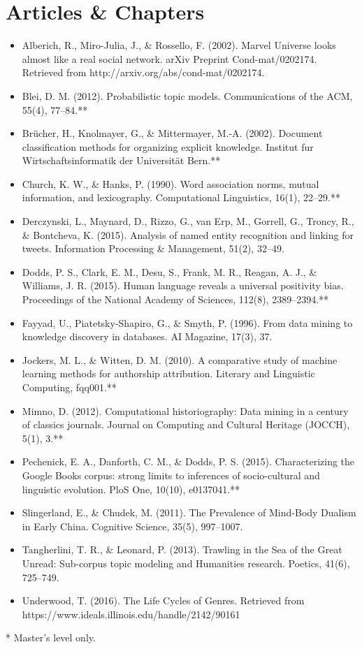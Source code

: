 \documentclass[12pt,a4paper]{article}
\begin{document}
\section*{Articles \& Chapters}	
\begin{itemize}
\item Alberich, R., Miro-Julia, J., \& Rossello, F. (2002). Marvel Universe looks almost like a real social network. arXiv Preprint Cond-mat/0202174. Retrieved from http://arxiv.org/abs/cond-mat/0202174.

\item Blei, D. M. (2012). Probabilistic topic models. Communications of the ACM, 55(4), 77–84.**
\item Brücher, H., Knolmayer, G., \& Mittermayer, M.-A. (2002). Document classification methods for organizing explicit knowledge. Institut fur Wirtschaftsinformatik der Universität Bern.**
\item Church, K. W., \& Hanks, P. (1990). Word association norms, mutual information, and lexicography. Computational Linguistics, 16(1), 22–29.**
\item Derczynski, L., Maynard, D., Rizzo, G., van Erp, M., Gorrell, G., Troncy, R., \& Bontcheva, K. (2015). Analysis of named entity recognition and linking for tweets. Information Processing \& Management, 51(2), 32–49.
\item Dodds, P. S., Clark, E. M., Desu, S., Frank, M. R., Reagan, A. J., \& Williams, J. R. (2015). Human language reveals a universal positivity bias. Proceedings of the National Academy of Sciences, 112(8), 2389–2394.**
\item Fayyad, U., Piatetsky-Shapiro, G., \& Smyth, P. (1996). From data mining to knowledge discovery in databases. AI Magazine, 17(3), 37.
\item Jockers, M. L., \& Witten, D. M. (2010). A comparative study of machine learning methods for authorship attribution. Literary and Linguistic Computing, fqq001.**
\item Mimno, D. (2012). Computational historiography: Data mining in a century of classics journals. Journal on Computing and Cultural Heritage (JOCCH), 5(1), 3.**
\item Pechenick, E. A., Danforth, C. M., \& Dodds, P. S. (2015). Characterizing the Google Books corpus: strong limits to inferences of socio-cultural and linguistic evolution. PloS One, 10(10), e0137041.**
\item Slingerland, E., \& Chudek, M. (2011). The Prevalence of Mind-Body Dualism in Early China. Cognitive Science, 35(5), 997–1007.
\item Tangherlini, T. R., \& Leonard, P. (2013). Trawling in the Sea of the Great Unread: Sub-corpus topic modeling and Humanities research. Poetics, 41(6), 725–749.
\item Underwood, T. (2016). The Life Cycles of Genres. Retrieved from https://www.ideals.illinois.edu/handle/2142/90161

\end{itemize}
{\scriptsize ** Master's level only.}
\end{document}
